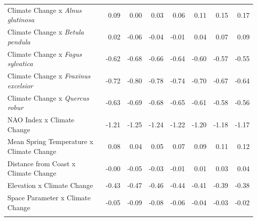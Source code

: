 \documentclass{article}\usepackage[]{graphicx}\usepackage[]{color}
\begin{document}
\begin{longtable}{lrrrrrrr}
  Climate Change
x\textit{ Alnus glutinosa} & 0.09 & 0.00 & 0.03 & 0.06 & 0.11 & 0.15 & 0.17 \\ 
  Climate Change
x\textit{ Betula pendula} & 0.02 & -0.06 & -0.04 & -0.01 & 0.04 & 0.07 & 0.09 \\ 
  Climate Change
x\textit{ Fagus sylvatica} & -0.62 & -0.68 & -0.66 & -0.64 & -0.60 & -0.57 & -0.55 \\ 
  Climate Change
x\textit{ Fraxinus excelsior} & -0.72 & -0.80 & -0.78 & -0.74 & -0.70 & -0.67 & -0.64 \\ 
  Climate Change
x\textit{ Quercus robur} & -0.63 & -0.69 & -0.68 & -0.65 & -0.61 & -0.58 & -0.56 \\ 
  NAO Index x Climate Change & -1.21 & -1.25 & -1.24 & -1.22 & -1.20 & -1.18 & -1.17 \\ 
  Mean Spring 
Temperature x Climate Change & 0.08 & 0.04 & 0.05 & 0.07 & 0.09 & 0.11 & 0.12 \\ 
  Distance from 
Coast x Climate Change & -0.00 & -0.05 & -0.03 & -0.01 & 0.01 & 0.03 & 0.04 \\ 
  Elevation x Climate Change & -0.43 & -0.47 & -0.46 & -0.44 & -0.41 & -0.39 & -0.38 \\ 
  Space Parameter x Climate Change & -0.05 & -0.09 & -0.08 & -0.06 & -0.04 & -0.03 & -0.02 \\ 
   \hline
\hline
\label{tab:suppmodlongtemps}
\end{longtable}
\end{document}
